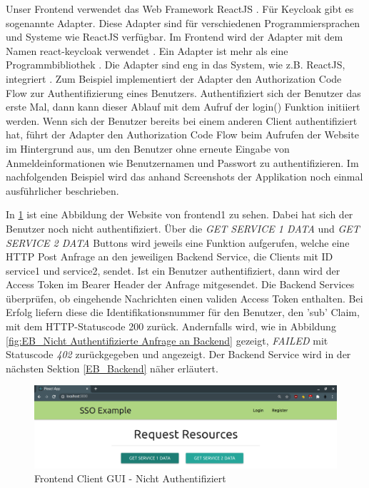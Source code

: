 Unser Frontend verwendet das Web Framework ReactJS \cite{EB43}. Für Keycloak gibt es sogenannte Adapter. Diese Adapter sind für verschiedenen Programmiersprachen und Systeme wie ReactJS verfügbar. Im Frontend wird der Adapter mit dem Namen react-keycloak verwendet \cite{EB36}. Ein Adapter ist mehr als eine Programmbibliothek \cite{EB43}. Die Adapter sind eng in das System, wie z.B. ReactJS, integriert \cite{EB43}. Zum Beispiel implementiert der Adapter den Authorization Code Flow zur Authentifizierung eines Benutzers. Authentifiziert sich der Benutzer das erste Mal, dann kann dieser Ablauf mit dem Aufruf der login() Funktion initiiert werden. Wenn sich der Benutzer bereits bei einem anderen Client authentifiziert hat, führt der Adapter den Authorization Code Flow beim Aufrufen der Website im Hintergrund aus, um den Benutzer ohne erneute Eingabe von Anmeldeinformationen wie Benutzernamen und Passwort zu authentifizieren. Im nachfolgenden Beispiel wird das anhand Screenshots der Applikation noch einmal ausführlicher beschrieben.

In \ref{fig:EB_Nicht Authentifiziert} ist eine Abbildung der Website von frontend1 zu sehen. Dabei hat sich der Benutzer noch nicht authentifiziert. Über die \textit{GET SERVICE 1 DATA} und \textit{GET SERVICE 2 DATA} Buttons wird jeweils eine Funktion aufgerufen, welche eine HTTP Post Anfrage an den jeweiligen Backend Service, die Clients mit ID service1 und service2, sendet. Ist ein Benutzer authentifiziert, dann wird der Access Token im Bearer Header der Anfrage mitgesendet. Die Backend Services überprüfen, ob eingehende Nachrichten einen validen Access Token enthalten. Bei Erfolg liefern diese die Identifikationsnummer für den Benutzer, den 'sub' Claim, mit dem HTTP-Statuscode 200 zurück. Andernfalls wird, wie in Abbildung \ref{fig:EB_Nicht Authentifizierte Anfrage an Backend} gezeigt, \textit{FAILED} mit Statuscode \textit{402} zurückgegeben und angezeigt. Der Backend Service wird in der nächsten Sektion \ref{EB_Backend} näher erläutert.

\begin{figure}[!ht]
	\centering
	\includegraphics[width=1\textwidth]{Images/Ebert/FrontendLoggedOut.PNG}
	\caption{Frontend Client GUI - Nicht Authentifiziert}
	\label{fig:EB_Nicht Authentifiziert}
\end{figure}

